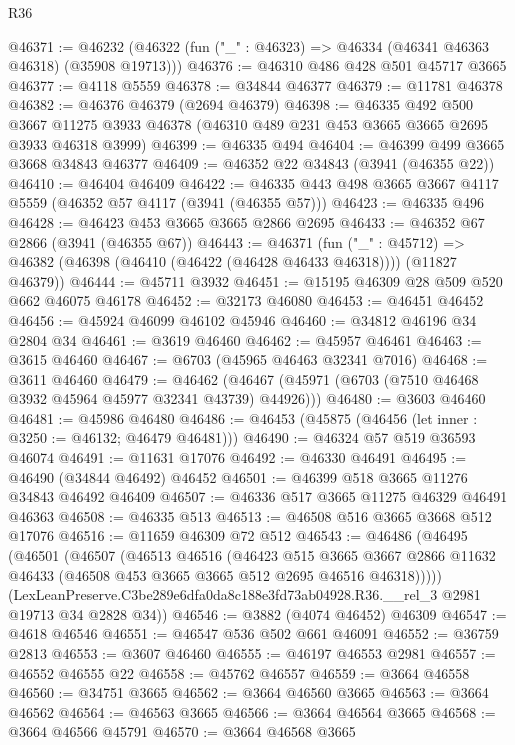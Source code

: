 \begin{lexlean}{R36}
\begin{coremodule}
@46371 := @46232 (@46322 (fun ("_" : @46323) => @46334 (@46341 @46363 @46318) (@35908 @19713)))
@46376 := @46310 @486 @428 @501 @45717 @3665
@46377 := @4118 @5559
@46378 := @34844 @46377
@46379 := @11781 @46378
@46382 := @46376 @46379 (@2694 @46379)
@46398 := @46335
    @492
    @500
    @3667
    @11275
    @3933
    @46378
    (@46310 @489 @231 @453 @3665 @3665 @2695 @3933 @46318 @3999)
@46399 := @46335 @494
@46404 := @46399 @499 @3665 @3668 @34843 @46377
@46409 := @46352 @22 @34843 (@3941 (@46355 @22))
@46410 := @46404 @46409
@46422 := @46335 @443 @498 @3665 @3667 @4117 @5559 (@46352 @57 @4117 (@3941 (@46355 @57)))
@46423 := @46335 @496
@46428 := @46423 @453 @3665 @3665 @2866 @2695
@46433 := @46352 @67 @2866 (@3941 (@46355 @67))
@46443 := @46371
    (fun ("_" : @45712) => @46382 (@46398 (@46410 (@46422 (@46428 @46433 @46318)))) (@11827 @46379))
@46444 := @45711 @3932
@46451 := @15195 @46309 @28 @509 @520 @662 @46075 @46178
@46452 := @32173 @46080
@46453 := @46451 @46452
@46456 := @45924 @46099 @46102 @45946
@46460 := @34812 @46196 @34 @2804 @34
@46461 := @3619 @46460
@46462 := @45957 @46461
@46463 := @3615 @46460
@46467 := @6703 (@45965 @46463 @32341 @7016)
@46468 := @3611 @46460
@46479 := @46462 (@46467 (@45971 (@6703 (@7510 @46468 @3932 @45964 @45977 @32341 @43739) @44926)))
@46480 := @3603 @46460
@46481 := @45986 @46480
@46486 := @46453 (@45875 (@46456 (let inner : @3250 := @46132; @46479 @46481)))
@46490 := @46324 @57 @519 @36593 @46074
@46491 := @11631 @17076
@46492 := @46330 @46491
@46495 := @46490 (@34844 @46492) @46452
@46501 := @46399 @518 @3665 @11276 @34843 @46492 @46409
@46507 := @46336 @517 @3665 @11275 @46329 @46491 @46363
@46508 := @46335 @513
@46513 := @46508 @516 @3665 @3668 @512 @17076
@46516 := @11659 @46309 @72 @512
@46543 := @46486
    (@46495
      (@46501
        (@46507
          (@46513
            @46516
            (@46423
              @515
              @3665
              @3667
              @2866
              @11632
              @46433
              (@46508 @453 @3665 @3665 @512 @2695 @46516 @46318)))))
      (LexLeanPreserve.C3be289e6dfa0da8c188e3fd73ab04928.R36.__rel_3 @2981 @19713 @34 @2828 @34))
@46546 := @3882 (@4074 @46452) @46309
@46547 := @4618 @46546
@46551 := @46547 @536 @502 @661 @46091
@46552 := @36759 @2813
@46553 := @3607 @46460
@46555 := @46197 @46553 @2981
@46557 := @46552 @46555 @22
@46558 := @45762 @46557
@46559 := @3664 @46558
@46560 := @34751 @3665
@46562 := @3664 @46560 @3665
@46563 := @3664 @46562
@46564 := @46563 @3665
@46566 := @3664 @46564 @3665
@46568 := @3664 @46566 @45791
@46570 := @3664 @46568 @3665

\end{coremodule}
\end{lexlean}
